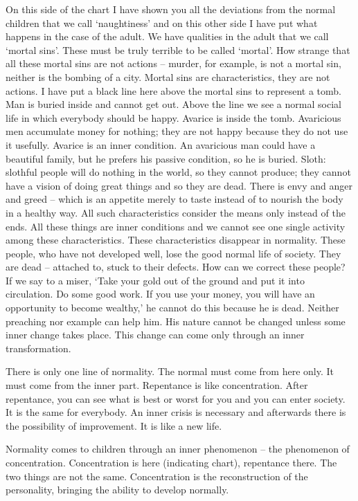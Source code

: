 \documentclass[lang=cn,10pt]{elegantbook}
\begin{document}
On this side of the chart I have shown you all the deviations
from the normal children that we call ‘naughtiness’ and on this other
side I have put what happens in the case of the adult. We have
qualities in the adult that we call ‘mortal sins’. These must be truly
terrible to be called ‘mortal’. How strange that all these mortal sins
are not actions – murder, for example, is not a mortal sin, neither is
the bombing of a city. Mortal sins are characteristics, they are not
actions. I have put a black line here above the mortal sins to
represent a tomb. Man is buried inside and cannot get out. Above
the line we see a normal social life in which everybody should be
happy. Avarice is inside the tomb. Avaricious men accumulate
money for nothing; they are not happy because they do not use it
usefully. Avarice is an inner condition. An avaricious man could have
a beautiful family, but he prefers his passive condition, so he is
buried. Sloth: slothful people will do nothing in the world, so they
cannot produce; they cannot have a vision of doing great things and
so they are dead. There is envy and anger and greed – which is an
appetite merely to taste instead of to nourish the body in a healthy
way. All such characteristics consider the means only instead of the
ends. All these things are inner conditions and we cannot see one
single activity among these characteristics. These characteristics
disappear in normality. These people, who have not developed well,
lose the good normal life of society. They are dead – attached to,
stuck to their defects. How can we correct these people? If we say to
a miser, ‘Take your gold out of the ground and put it into circulation.
Do some good work. If you use your money, you will have an
opportunity to become wealthy,’ he cannot do this because he is
dead. Neither preaching nor example can help him. His nature
cannot be changed unless some inner change takes place. This
change can come only through an inner transformation.

There is only one line of normality. The normal must come from
here only. It must come from the inner part. Repentance is like
concentration. After repentance, you can see what is best or worst
for you and you can enter society. It is the same for everybody. An
inner crisis is necessary and afterwards there is the possibility of
improvement. It is like a new life.

Normality comes to children through an inner phenomenon –
the phenomenon of concentration. Concentration is here (indicating
chart), repentance there. The two things are not the same.
Concentration is the reconstruction of the personality, bringing the
ability to develop normally.
\end{document}
